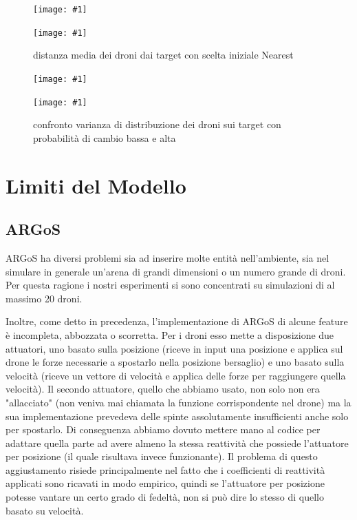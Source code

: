 \documentclass[a4paper,11pt,oneside, table]{article}
\newcommand{\putsubimage}[5] {
  \begin{minipage}{{#4}\linewidth}
	    \centering
      \texttt{[image: \#1]}
	    \caption{#2}\label{#3}
	\end{minipage}
}
\newcommand{\putimagecouple}[2] {
  \begin{figure}[!htb]
      \centering
      #1
      \hspace{0.5cm}
      #2
  \end{figure}
}
\begin{document}
\putimagecouple
{\putsubimage{images/experiments/task-allocator-nearest-shortened/MeanDistanceFromTarget.png}{distanza media dei droni dai target con scelta iniziale Nearest}{png:task-allocator-nearest-shortened-MeanDistanceFromTarget}{0.4}{0.99}}
{\putsubimage{images/experiments/task-allocator-random-shortened/MeanDistanceFromTarget.png}{distanza media dei droni dai target con scelta iniziale Nearest}{png:task-allocator-random-shortened-MeanDistanceFromTarget}{0.4}{0.99}}

\putimagecouple
{\putsubimage{images/experiments/task-allocator-random-shortened/VarTargetDensityOverTime.png}{varianza di distribuzione dei droni sui target con probabilit\`a di cambio bassa}{png:task-allocator-random-shortened-VarTargetDensityOverTime}{0.4}{0.99}}
{\putsubimage{images/experiments/task-allocator-random-always/VarTargetDensityOverTime.png}{confronto varianza di distribuzione dei droni sui target con probabilit\`a di cambio bassa e alta}{png:task-allocator-random-always-VarTargetDensityOverTime}{0.4}{0.99}}

\pagebreak

\section{Limiti del Modello}

\subsection{ARGoS}

ARGoS ha diversi problemi sia ad inserire molte entit\`a nell'ambiente, sia nel simulare in generale un'arena di grandi dimensioni o un numero grande di droni.
Per questa ragione i nostri esperimenti si sono concentrati su simulazioni di al massimo 20 droni.

Inoltre, come detto in precedenza, l'implementazione di ARGoS di alcune feature \`e incompleta, abbozzata o scorretta.
Per i droni esso mette a disposizione due attuatori, uno basato sulla posizione (riceve in input una posizione e applica sul drone le forze necessarie a spostarlo nella posizione bersaglio) e uno basato sulla velocit\`a (riceve un vettore di velocit\`a e applica delle forze per raggiungere quella velocit\`a).
Il secondo attuatore, quello che abbiamo usato, non solo non era "allacciato" (non veniva mai chiamata la funzione corrispondente nel drone) ma la sua implementazione prevedeva delle spinte assolutamente insufficienti anche solo per spostarlo.
Di conseguenza abbiamo dovuto mettere mano al codice per adattare quella parte ad avere almeno la stessa reattivit\`a che possiede l'attuatore per posizione (il quale risultava invece funzionante).
Il problema di questo aggiustamento risiede principalmente nel fatto che i coefficienti di reattivit\`a applicati sono ricavati in modo empirico, quindi se l'attuatore per posizione potesse vantare un certo grado di fedelt\`a, non si pu\`o dire lo stesso di quello basato su velocit\`a.
\end{document}
